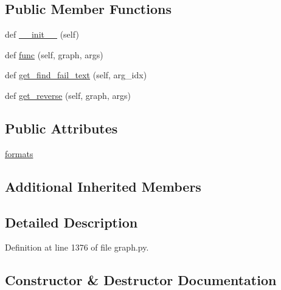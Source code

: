 \subsection*{Public Member Functions}
\begin{DoxyCompactItemize}
\item 
def \hyperlink{classlight__chats_1_1graph_1_1GiveObjectFunction_a1ad77504961b2163c1ec8789c89022b9}{\+\_\+\+\_\+init\+\_\+\+\_\+} (self)
\item 
def \hyperlink{classlight__chats_1_1graph_1_1GiveObjectFunction_a8debb985c3252b31e92837bb6cb0d227}{func} (self, graph, args)
\item 
def \hyperlink{classlight__chats_1_1graph_1_1GiveObjectFunction_a53aa62498243387346fe8e3bae0434e2}{get\+\_\+find\+\_\+fail\+\_\+text} (self, arg\+\_\+idx)
\item 
def \hyperlink{classlight__chats_1_1graph_1_1GiveObjectFunction_a5339f851bf119b82f9f8d8abbbeeabb3}{get\+\_\+reverse} (self, graph, args)
\end{DoxyCompactItemize}
\subsection*{Public Attributes}
\begin{DoxyCompactItemize}
\item 
\hyperlink{classlight__chats_1_1graph_1_1GiveObjectFunction_a0fec6f9aa2b89ddc4ab44917d13eaaf6}{formats}
\end{DoxyCompactItemize}
\subsection*{Additional Inherited Members}


\subsection{Detailed Description}
\begin{DoxyVerb}\end{DoxyVerb}
 

Definition at line 1376 of file graph.\+py.



\subsection{Constructor \& Destructor Documentation}
\mbox{\label{classlight__chats_1_1graph_1_1GiveObjectFunction_a1ad77504961b2163c1ec8789c89022b9}} 
